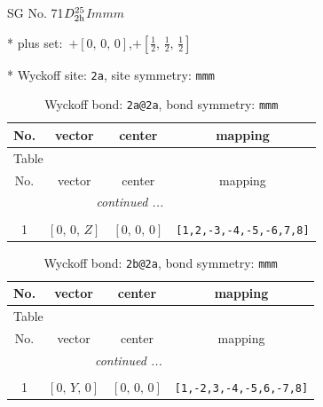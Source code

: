 \documentclass[fleqn,8pt]{jsarticle}
\begin{document}
\setcounter{MaxMatrixCols}{32}

\renewcommand{\tablename}{Table~}
\renewcommand{\figurename}{Figure~}
\begin{center}
\LARGE
SG No. 71\quad$D_{\rm 2h}^{25}$\quad$Immm$\quad[ orthorhombic ]
\end{center}

* plus set:\,\,\,$+\left[ 0,\, 0,\, 0 \right]$,\quad $+\left[ \frac{1}{2},\, \frac{1}{2},\, \frac{1}{2} \right]$


* Wyckoff site: {\tt 2a}, site symmetry: {\tt mmm}
\renewcommand{\arraystretch}{1.2}
\begin{longtable}{cccc}
\caption{Wyckoff bond: {\tt 2a@2a}, bond symmetry: {\tt mmm}}
 \\
 \hline \hline
No. & vector & center & mapping \\ \hline \endfirsthead

\multicolumn{3}{l}{\tablename\ \thetable{}} \\
 \hline \hline
No. & vector & center & mapping \\ \hline \endhead

 \hline \hline
\multicolumn{3}{r}{\footnotesize\it continued ...} \\ \endfoot

 \hline \hline
\multicolumn{3}{r}{} \\ \endlastfoot

1 & $\left[ 0,\, 0,\, Z \right]$ & $\left[ 0,\, 0,\, 0 \right]$ & {\tt [1,2,-3,-4,-5,-6,7,8]} \\
\end{longtable}
\renewcommand{\arraystretch}{1.2}
\begin{longtable}{cccc}
\caption{Wyckoff bond: {\tt 2b@2a}, bond symmetry: {\tt mmm}}
 \\
 \hline \hline
No. & vector & center & mapping \\ \hline \endfirsthead

\multicolumn{3}{l}{\tablename\ \thetable{}} \\
 \hline \hline
No. & vector & center & mapping \\ \hline \endhead

 \hline \hline
\multicolumn{3}{r}{\footnotesize\it continued ...} \\ \endfoot

 \hline \hline
\multicolumn{3}{r}{} \\ \endlastfoot

1 & $\left[ 0,\, Y,\, 0 \right]$ & $\left[ 0,\, 0,\, 0 \right]$ & {\tt [1,-2,3,-4,-5,6,-7,8]} \\
\end{longtable}
\end{document}
